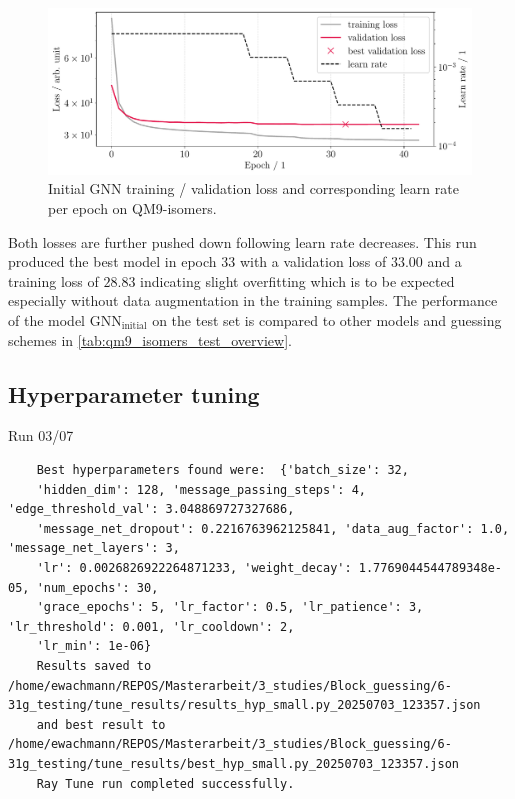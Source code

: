 \begin{figure}[H]
    \centering
    \includegraphics[width=\textwidth]{../fig/gnn/MGNN_6-31G_NO_AUG_07_07_manual_ref_train_val_loss.pdf}
    \caption[Initial GNN loss on QM9-isomers]{Initial GNN training / validation loss and corresponding learn rate per epoch on QM9-isomers.}
    \label{fig:initial_train_qm9_isomers}
\end{figure}
Both losses are further pushed down following learn rate decreases. This run produced the best model in epoch 33 with a validation loss of $33.00$ and a training loss of $28.83$ indicating slight overfitting which is to be expected especially without data augmentation in the training samples. The performance of the model $\text{GNN}_\text{initial}$ on the test set is compared to other models and guessing schemes in \autoref{tab:qm9_isomers_test_overview}. 



\subsection{Hyperparameter tuning}
\label{subsec:qm9_isomers_hyperparamtuning}



Run 03/07
\begin{verbatim}
    Best hyperparameters found were:  {'batch_size': 32, 
    'hidden_dim': 128, 'message_passing_steps': 4, 'edge_threshold_val': 3.048869727327686, 
    'message_net_dropout': 0.2216763962125841, 'data_aug_factor': 1.0, 'message_net_layers': 3, 
    'lr': 0.0026826922264871233, 'weight_decay': 1.7769044544789348e-05, 'num_epochs': 30, 
    'grace_epochs': 5, 'lr_factor': 0.5, 'lr_patience': 3, 'lr_threshold': 0.001, 'lr_cooldown': 2, 
    'lr_min': 1e-06}
    Results saved to /home/ewachmann/REPOS/Masterarbeit/3_studies/Block_guessing/6-31g_testing/tune_results/results_hyp_small.py_20250703_123357.json 
    and best result to /home/ewachmann/REPOS/Masterarbeit/3_studies/Block_guessing/6-31g_testing/tune_results/best_hyp_small.py_20250703_123357.json
    Ray Tune run completed successfully.
\end{verbatim}


